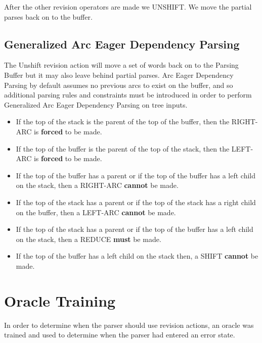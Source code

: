 \documentclass[11pt]{article}
\begin{document}
After the other revision operators are made we UNSHIFT. We move the partial parses back on to the buffer. 




\subsection{Generalized Arc Eager Dependency Parsing}
The Unshift revision action will move a set of words back on to the Parsing Buffer but it may also leave behind partial parses. 
Arc Eager Dependency Parsing by default assumes no previous arcs to exist on the buffer, and so additional parsing rules and constraints must be introduced in order to perform Generalized Arc Eager Dependency Parsing on tree inputs.

\begin{itemize}

\item If the top of the stack is the parent of the top of the buffer, then the RIGHT-ARC is \textbf{forced} to be made.

\item If the top of the buffer is the parent of the top of the stack, then the LEFT-ARC is \textbf{forced} to be made.

\item If the top of the buffer has a parent or if the top of the buffer has a left child on the stack, then a RIGHT-ARC \textbf{cannot} be made.

\item If the top of the stack has a parent or if the top of the stack has a right child on the buffer, then a LEFT-ARC \textbf{cannot} be made.

\item If the top of the stack has a parent or if the top of the buffer has a left child on the stack, then a REDUCE \textbf{must} be made.

\item If the top of the buffer has a left child on the stack then, a SHIFT \textbf{cannot} be made.

\end{itemize}





\section{Oracle Training}
In order to determine when the parser should use revision actions, an oracle was trained and used to determine when the parser had entered an error state.
\end{document}
